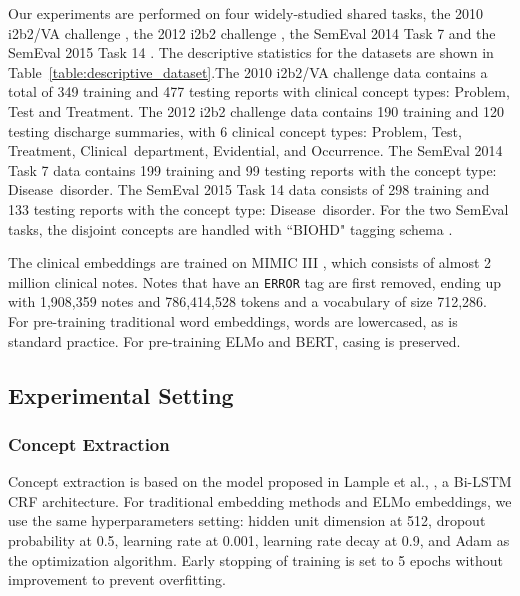 \documentclass[11pt,a4paper]{article}
\begin{document}
Our experiments are performed on four widely-studied shared tasks, the 2010 i2b2/VA challenge \cite{uzuner20112010}, the 2012 i2b2 challenge \cite{sun2013evaluating}, the SemEval 2014  Task 7 \cite{pradhan2014semeval}  and the SemEval 2015 Task 14 \cite{elhadad2015semeval}.  The descriptive statistics for the datasets are shown in Table~\ref{table:descriptive_dataset}.The 2010 i2b2/VA challenge data contains a total of 349 training and 477 testing reports with clinical concept types: {\sc Problem}, {\sc Test} and {\sc Treatment}. The 2012 i2b2 challenge data contains 190 training and 120 testing discharge summaries, with 6 clinical concept types: {\sc Problem}, {\sc Test}, {\sc Treatment}, \hbox{\sc Clinical~department}, {\sc Evidential}, and {\sc Occurrence}. The SemEval 2014 Task 7 data contains 199 training and 99 testing reports with the concept type: \hbox{\sc Disease~disorder}. The SemEval 2015 Task 14 data consists of 298 training and 133 testing reports with the concept type: \hbox{\sc Disease~disorder}.
For the two SemEval tasks, the disjoint concepts are handled with ``BIOHD" tagging schema  \cite{tang2015recognizing}.



The clinical embeddings are trained on MIMIC III \cite{johnson2016mimic}, which consists of almost 2 million clinical notes. Notes that have an \texttt{\small ERROR} tag are first removed, ending up with 1,908,359 notes and 786,414,528 tokens and a vocabulary of size 712,286. For pre-training traditional word embeddings, words are lowercased, as is standard practice. For pre-training ELMo and BERT, casing is preserved.




\subsection{Experimental Setting}

\subsubsection{Concept Extraction}


Concept extraction is based on the model proposed in Lample et al., , a Bi-LSTM CRF architecture. For traditional embedding methods and ELMo embeddings, we use the same hyperparameters setting: hidden unit dimension at 512, dropout probability at 0.5, learning rate at 0.001, learning rate decay at 0.9, and Adam as the optimization algorithm. Early stopping of training is set to 5 epochs without improvement to prevent overfitting.
\end{document}

